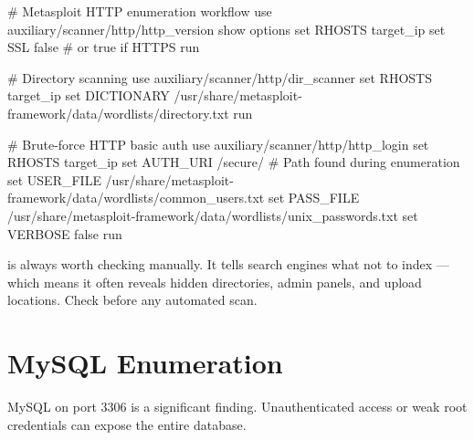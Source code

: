 \begin{notebox}
\begin{termbox}
# Metasploit HTTP enumeration workflow
use auxiliary/scanner/http/http_version
show options
set RHOSTS target_ip
set SSL false     # or true if HTTPS
run

# Directory scanning
use auxiliary/scanner/http/dir_scanner
set RHOSTS target_ip
set DICTIONARY /usr/share/metasploit-framework/data/wordlists/directory.txt
run

# Brute-force HTTP basic auth
use auxiliary/scanner/http/http_login
set RHOSTS target_ip
set AUTH_URI /secure/          # Path found during enumeration
set USER_FILE /usr/share/metasploit-framework/data/wordlists/common_users.txt
set PASS_FILE /usr/share/metasploit-framework/data/wordlists/unix_passwords.txt
set VERBOSE false
run
\end{termbox}

\begin{notebox}
 is always worth checking manually. It tells search engines
what not to index --- which means it often reveals hidden directories, admin
panels, and upload locations. Check  before any
automated scan.
\end{notebox}



\section{MySQL Enumeration}
\label{sec:mysql_enum}

MySQL on port 3306 is a significant finding. Unauthenticated access or weak
root credentials can expose the entire database.

\end{notebox}

